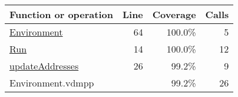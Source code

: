 \bigskip
\begin{longtable}{|l|r|r|r|}
\hline
Function or operation & Line & Coverage & Calls \\
\hline
\hline
\hyperref[Environment:64]{Environment} & 64&100.0\% & 5 \\
\hline
\hyperref[Run:14]{Run} & 14&100.0\% & 12 \\
\hline
\hyperref[updateAddresses:26]{updateAddresses} & 26&99.2\% & 9 \\
\hline
\hline
Environment.vdmpp & & 99.2\% & 26 \\
\hline
\end{longtable}

